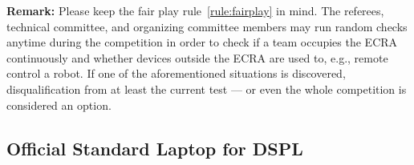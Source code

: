 
\textbf{Remark:} Please keep the fair play rule~\ref{rule:fairplay} in mind. The referees, technical committee,
        and organizing committee members may run random checks anytime during the competition in order to check if a team
        occupies the ECRA continuously and whether devices outside the ECRA are used to, e.g., remote control a robot.
        If one of the aforementioned situations is discovered, disqualification from at least the current test --- or
        even the whole competition is considered an option.


\subsection{Official Standard Laptop for DSPL}
\label{rule:osl_dspl}
% 
% 

